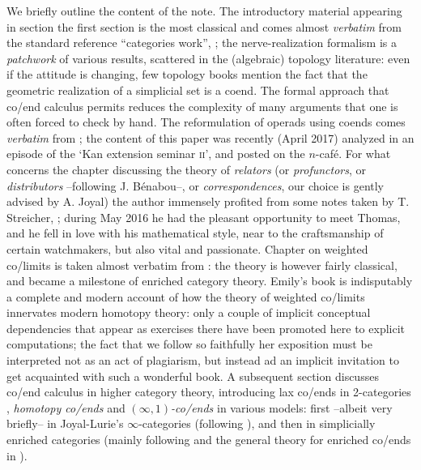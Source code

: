 We briefly outline the content of the note. The introductory material appearing in section the first section is the most classical and comes almost \emph{verbatim} from the standard reference ``categories work'', \cite{McL}; the nerve\hyp{}realization formalism is a \emph{patchwork} of various results, scattered in the (algebraic) topology literature: even if the attitude is changing, few topology books mention the fact that the geometric realization of a simplicial set is a coend. The formal approach that co/end calculus permits reduces the complexity of many arguments that one is often forced to check by hand.
The reformulation of operads using coends comes \emph{verbatim} from \cite{Kelly2005a}; the content of this paper was recently (April 2017) analyzed in an episode of the `Kan extension seminar \textsc{ii}', and posted on the $n$-café.
For what concerns the chapter discussing the theory of \emph{relators} (or \emph{profunctors}, or \emph{distributors} --following J\@. Bénabou--, or \emph{correspondences}, our choice is gently advised by A\@. Joyal) the author immensely profited from some notes taken by T\@. Streicher, \cite{benabou2000distributors}; during May 2016 he had the pleasant opportunity to meet Thomas, and he fell in love with his mathematical style, near to the craftsmanship of certain watchmakers, but also vital and passionate.%
Chapter  on weighted co/limits is taken almost verbatim from \cite[\textbf{II.7}]{riehl2014categorical}: the theory is however fairly classical, and became a milestone of enriched category theory. Emily's book is indisputably a complete and modern account of how the theory of weighted co/limits innervates modern homotopy theory: only a couple of implicit conceptual dependencies that appear as exercises there have been promoted here to explicit computations; the fact that we follow so faithfully her exposition must be interpreted not as an act of plagiarism, but instead ad an implicit invitation to get acquainted with such a wonderful book.
A subsequent section discusses co/end calculus in higher category theory, introducing lax co/ends in 2\hyp{}categories \cite{bozapalides1977finsgen,bozapalides1975fins,bozapalides1980some}, \emph{homotopy co/ends} \cite{DrorFar98,Isaacson} and \emph{$(\infty,1)$\hyp{}co/ends} in various models: first --albeit very briefly-- in Joyal\hyp{}Lurie's $\infty$\hyp{}categories (following \cite{gepner2015lax}), and then in simplicially enriched categories (mainly following \cite{cordier1997homotopy} and the general theory for enriched co/ends in \cite{dubuc1970kan,Graya}).

